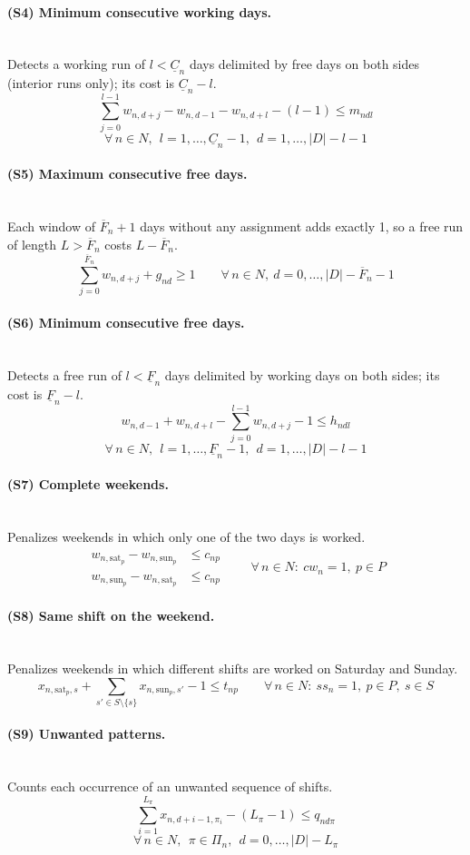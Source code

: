 \documentclass[11pt,a4paper]{article}
\newcommand{\Cmin}{\underline{C}}   \newcommand{\Cmax}{\overline{C}}
\newcommand{\Fmin}{\underline{F}}   \newcommand{\Fmax}{\overline{F}}
\newcommand{\sat}{\mathrm{sat}}     \newcommand{\sun}{\mathrm{sun}}
\newcommand{\forallidx}[1]{\qquad \forall\, #1}
\newcommand{\constraint}[2]{\paragraph{#1}\mbox{}\\[-0.4em] #2}
\begin{document}
\constraint{(S4) Minimum consecutive working days.}{Detects a working run of $l<\Cmin_n$ days delimited by free days on both sides (interior runs only); its cost is $\Cmin_n-l$.}
\begin{equation}\tag{S4}\label{c:minw}
\sum_{j=0}^{l-1} w_{n,d+j}-w_{n,d-1}-w_{n,d+l}-(l-1)\le m_{ndl}
\end{equation}
\[\forall\, n\in N,\ \ l=1,\dots,\Cmin_n-1,\ \ d=1,\dots,|D|-l-1\]

\constraint{(S5) Maximum consecutive free days.}{Each window of $\Fmax_n+1$ days without any assignment adds exactly 1, so a free run of length $L>\Fmax_n$ costs $L-\Fmax_n$.}
\begin{equation}\tag{S5}\label{c:maxf}
\sum_{j=0}^{\Fmax_n} w_{n,d+j}+g_{nd}\ge 1
\forallidx{n\in N,\ d=0,\dots,|D|-\Fmax_n-1}
\end{equation}

\constraint{(S6) Minimum consecutive free days.}{Detects a free run of $l<\Fmin_n$ days delimited by working days on both sides; its cost is $\Fmin_n-l$.}
\begin{equation}\tag{S6}\label{c:minf}
w_{n,d-1}+w_{n,d+l}-\sum_{j=0}^{l-1} w_{n,d+j}-1\le h_{ndl}
\end{equation}
\[\forall\, n\in N,\ \ l=1,\dots,\Fmin_n-1,\ \ d=1,\dots,|D|-l-1\]

\constraint{(S7) Complete weekends.}{Penalizes weekends in which only one of the two days is worked.}
\begin{equation}\tag{S7}\label{c:cwe}
\begin{aligned}
w_{n,\sat_p}-w_{n,\sun_p}&\le c_{np}\\
w_{n,\sun_p}-w_{n,\sat_p}&\le c_{np}
\end{aligned}
\forallidx{n\in N:\ cw_n=1,\ p\in P}
\end{equation}

\constraint{(S8) Same shift on the weekend.}{Penalizes weekends in which different shifts are worked on Saturday and Sunday.}
\begin{equation}\tag{S8}\label{c:sse}
x_{n,\sat_p,s}+\sum_{s'\in S\setminus\{s\}} x_{n,\sun_p,s'}-1\le t_{np}
\forallidx{n\in N:\ ss_n=1,\ p\in P,\ s\in S}
\end{equation}

\constraint{(S9) Unwanted patterns.}{Counts each occurrence of an unwanted sequence of shifts.}
\begin{equation}\tag{S9}\label{c:pat}
\sum_{i=1}^{L_\pi} x_{n,d+i-1,\pi_i}-(L_\pi-1)\le q_{nd\pi}
\end{equation}
\[\forall\, n\in N,\ \ \pi\in\Pi_n,\ \ d=0,\dots,|D|-L_\pi\]
\end{document}
